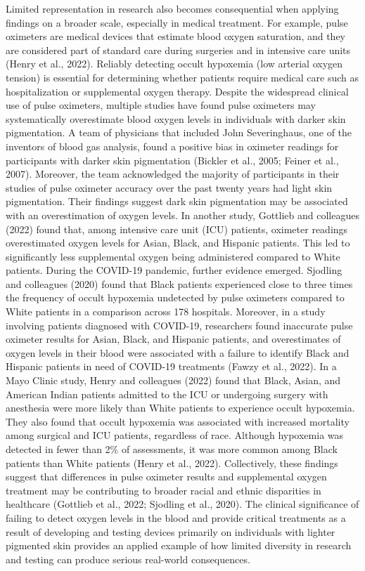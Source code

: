 \documentclass[
  11pt,
]{book}
\begin{document}
Limited representation in research also becomes consequential when applying findings on a broader scale, especially in medical treatment. For example, pulse oximeters are medical devices that estimate blood oxygen saturation, and they are considered part of standard care during surgeries and in intensive care units (Henry et al., 2022). Reliably detecting occult hypoxemia (low arterial oxygen tension) is essential for determining whether patients require medical care such as hospitalization or supplemental oxygen therapy. Despite the widespread clinical use of pulse oximeters, multiple studies have found pulse oximeters may systematically overestimate blood oxygen levels in individuals with darker skin pigmentation. A team of physicians that included John Severinghaus, one of the inventors of blood gas analysis, found a positive bias in oximeter readings for participants with darker skin pigmentation (Bickler et al., 2005; Feiner et al., 2007). Moreover, the team acknowledged the majority of participants in their studies of pulse oximeter accuracy over the past twenty years had light skin pigmentation. Their findings suggest dark skin pigmentation may be associated with an overestimation of oxygen levels. In another study, Gottlieb and colleagues (2022) found that, among intensive care unit (ICU) patients, oximeter readings overestimated oxygen levels for Asian, Black, and Hispanic patients. This led to significantly less supplemental oxygen being administered compared to White patients. During the COVID-19 pandemic, further evidence emerged. Sjodling and colleagues (2020) found that Black patients experienced close to three times the frequency of occult hypoxemia undetected by pulse oximeters compared to White patients in a comparison across 178 hospitals. Moreover, in a study involving patients diagnosed with COVID-19, researchers found inaccurate pulse oximeter results for Asian, Black, and Hispanic patients, and overestimates of oxygen levels in their blood were associated with a failure to identify Black and Hispanic patients in need of COVID-19 treatments (Fawzy et al., 2022). In a Mayo Clinic study, Henry and colleagues (2022) found that Black, Asian, and American Indian patients admitted to the ICU or undergoing surgery with anesthesia were more likely than White patients to experience occult hypoxemia. They also found that occult hypoxemia was associated with increased mortality among surgical and ICU patients, regardless of race. Although hypoxemia was detected in fewer than 2\% of assessments, it was more common among Black patients than White patients (Henry et al., 2022). Collectively, these findings suggest that differences in pulse oximeter results and supplemental oxygen treatment may be contributing to broader racial and ethnic disparities in healthcare (Gottlieb et al., 2022; Sjodling et al., 2020). The clinical significance of failing to detect oxygen levels in the blood and provide critical treatments as a result of developing and testing devices primarily on individuals with lighter pigmented skin provides an applied example of how limited diversity in research and testing can produce serious real-world consequences.
\end{document}
